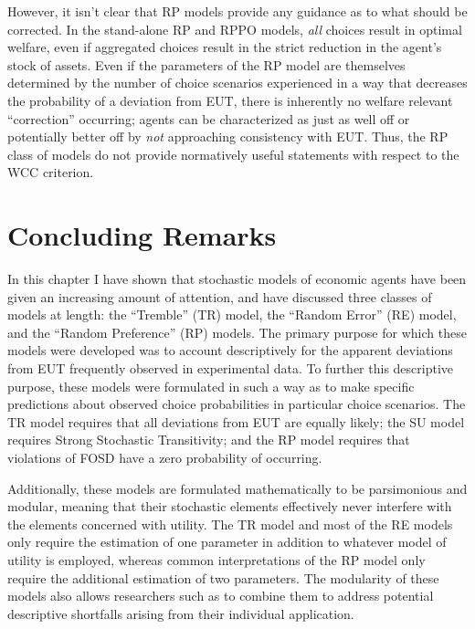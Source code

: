 \documentclass[../main.tex]{subfiles}
\begin{document}
However, it isn't clear that RP models provide any guidance as to what should be corrected.
In the stand-alone RP and RPPO models, \textit{all} choices result in optimal welfare, even if aggregated choices result in the strict reduction in the agent's stock of assets.
Even if the parameters of the RP model are themselves determined by the number of choice scenarios experienced in a way that decreases the probability of a deviation from EUT, there is inherently no welfare relevant \enquote{correction} occurring;
agents can be characterized as just as well off or potentially better off by \textit{not} approaching consistency with EUT.
Thus, the RP class of models do not provide normatively useful statements with respect to the WCC criterion.

\singlespacing
\section{Concluding Remarks}
\doublespacing

In this chapter I have shown that stochastic models of economic agents have been given an increasing amount of attention, and have discussed three classes of models at length: the \enquote{Tremble} (TR) model, the \enquote{Random Error} (RE) model, and the \enquote{Random Preference} (RP) models.
The primary purpose for which these models were developed was to account descriptively for the apparent deviations from EUT frequently observed in experimental data.
To further this descriptive purpose, these models were formulated in such a way as to make specific predictions about observed choice probabilities in particular choice scenarios.
The TR model requires that all deviations from EUT are equally likely;
the SU model requires Strong Stochastic Transitivity;
and the RP model requires that violations of FOSD have a zero probability of occurring.

Additionally, these models are formulated mathematically to be parsimonious and modular, meaning that their stochastic elements effectively never interfere with the elements concerned with utility.
The TR model and most of the RE models only require the estimation of one parameter in addition to whatever model of utility is employed, whereas common interpretations of the RP model only require the additional estimation of two parameters.
The modularity of these models also allows researchers such as \textcite{Loomes2002} to combine them to address potential descriptive shortfalls arising from their individual application.
\end{document}
